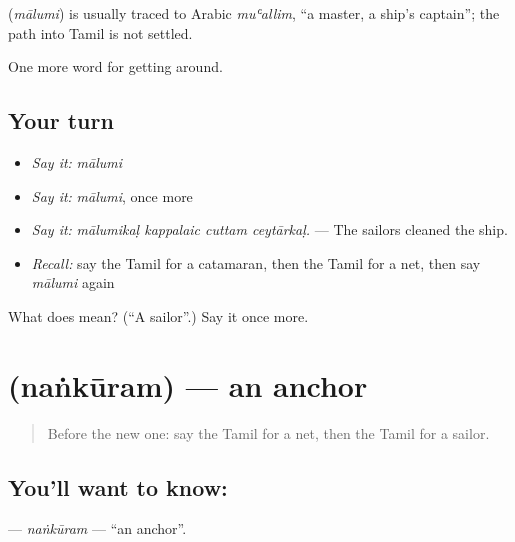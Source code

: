 \begin{cousinweb}
\textbf{} (\emph{mālumi}) is usually traced to Arabic \emph{muʿallim}, \textquotedblleft{}a master, a ship's captain\textquotedblright{}; the path into Tamil is not settled.
\end{cousinweb}

\begin{grammarlens}[title={What you've built}]
One more word for getting around.
\end{grammarlens}

\subsection*{Your turn}
\begin{itemize}
\raggedright
  \item \emph{Say it:} \emph{mālumi}
  \item \emph{Say it:} \emph{mālumi}, once more
  \item \emph{Say it:} \emph{mālumikaḷ kappalaic cuttam ceytārkaḷ.} — The sailors cleaned the ship.
  \item \emph{Recall:} say the Tamil for a catamaran, then the Tamil for a net, then say \emph{mālumi} again
\end{itemize}

\begin{tcolorbox}[breakable,colback=teal!4,colframe=teal!35!black,title={Before you move on}]
What does  mean? (\textquotedblleft{}A sailor\textquotedblright{}.) Say it once more.
\end{tcolorbox}
\section[\texorpdfstring{\ta{நங்கூரம்} (naṅkūram)}{நங்கூரம் (naṅkūram)}]{ (naṅkūram) — an anchor}

\label{lesson:TA-C417-nankuram}



\begin{quote}
Before the new one: say the Tamil for a net, then the Tamil for a sailor.
\end{quote}

\subsection*{You'll want to know: }
\textbf{} — \emph{naṅkūram} — \textquotedblleft{}an anchor\textquotedblright{}.

